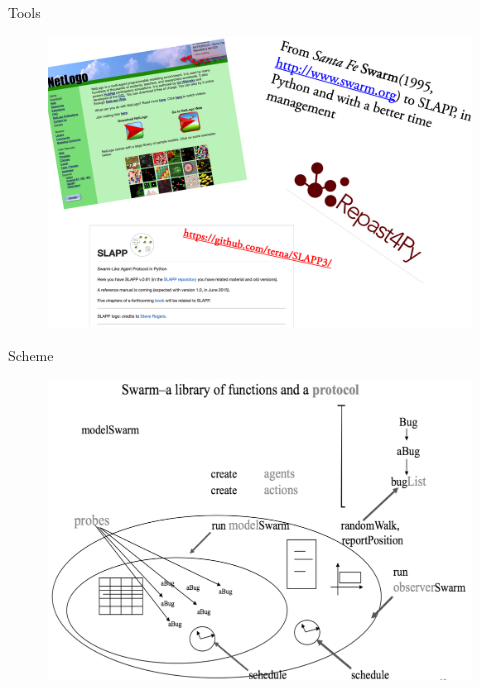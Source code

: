 \documentclass[9pt]{beamer}
\begin{document}
\begin{frame}{Tools}

\begin{figure}[H]
\center
\includegraphics[scale=0.14]{tools.png}
\label{tools}
\end{figure}


\end{frame}

\begin{frame}{Scheme}

\begin{figure}[H]
\center
\includegraphics[scale=0.26]{scheme.png}
\label{scheme}
\end{figure}


\end{frame}
\end{document}
